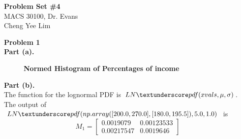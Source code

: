 \documentclass[letterpaper,12pt]{article}
\theoremstyle{definition}
\begin{document}
\begin{flushleft}
  \textbf{\large{Problem Set \#4}} \\
  MACS 30100, Dr. Evans \\
  Cheng Yee Lim
\end{flushleft}

\vspace{5mm}

\noindent\textbf{Problem 1}\\
\textbf{Part (a).}
\begin{figure}[htb]\centering\captionsetup{width=4.0in}
  \caption{\textbf{Normed Histogram of Percentages of income}}\label{FigExample}
\end{figure}

\pagebreak
\flushleft
\textbf{Part (b).} \\

\flushleft 
The function for the lognormal PDF is $LN\textunderscore pdf(xvals, \mu, \sigma)$. \\
The output of $LN\textunderscore pdf(np.array([200.0, 270.0], [180.0, 195.5]), 5.0, 1.0)$ is 
\[
M_1 =
  \begin{bmatrix}
		0.0019079 & 0.00123533 \\
		0.00217547 & 0.0019646
  \end{bmatrix}
\]
\end{document}
